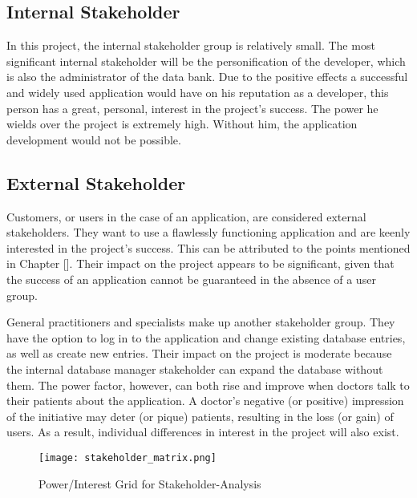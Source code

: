 \subsection{Internal Stakeholder}
In this project, the internal stakeholder group is relatively small. The most significant internal stakeholder will be the personification of the developer, which is also the administrator of the data bank. Due to the positive effects a successful and widely used application would have on his reputation as a developer, this person has a great, personal, interest in the project's success. The power he wields over the project is extremely high. Without him, the application development would not be possible. 
\subsection{External Stakeholder}
Customers, or users in the case of an application, are considered external stakeholders. They want to use a flawlessly functioning application and are keenly interested in the project's success. This can be attributed to the points mentioned in Chapter []. Their impact on the project appears to be significant, given that the success of an application cannot be guaranteed in the absence of a user group.

General practitioners and specialists make up another stakeholder group. They have the option to log in to the application and change existing database entries, as well as create new entries. Their impact on the project is moderate because the internal database manager stakeholder can expand the database without them. The power factor, however, can both rise and improve when doctors talk to their patients about the application. A doctor's negative (or positive) impression of the initiative may deter (or pique) patients, resulting in the loss (or gain) of users. As a result, individual differences in interest in the project will also exist.

\begin{figure}[h]
	\centering
	\texttt{[image: stakeholder\_matrix.png]}
	\caption[Power/Interest Grid for Stakeholder-Analysis ]{Power/Interest Grid for Stakeholder-Analysis}
\end{figure}	

